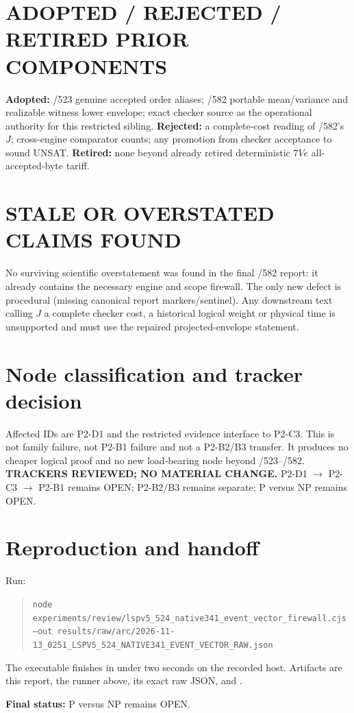 \documentclass[11pt]{article}
\begin{document}
\section*{ADOPTED / REJECTED / RETIRED PRIOR COMPONENTS}
\textbf{Adopted:} /523 genuine accepted order aliases; /582 portable mean/variance and realizable witness lower envelope; exact checker source as the operational authority for this restricted sibling.  \textbf{Rejected:} a complete-cost reading of /582's $J$; cross-engine comparator counts; any promotion from checker acceptance to sound UNSAT.  \textbf{Retired:} none beyond already retired deterministic $7Ve$ all-accepted-byte tariff.

\section*{STALE OR OVERSTATED CLAIMS FOUND}
No surviving scientific overstatement was found in the final /582 report: it already contains the necessary engine and scope firewall.  The only new defect is procedural (missing canonical report markers/sentinel).  Any downstream text calling $J$ a complete checker cost, a historical logical weight or physical time is unsupported and must use the repaired projected-envelope statement.

\section*{Node classification and tracker decision}
Affected IDs are P2-D1 and the restricted evidence interface to P2-C3.  This is not family failure, not P2-B1 failure and not a P2-B2/B3 transfer.  It produces no cheaper logical proof and no new load-bearing node beyond /523--/582.  \textbf{TRACKERS REVIEWED; NO MATERIAL CHANGE.}  P2-D1 $\to$ P2-C3 $\to$ P2-B1 remains OPEN; P2-B2/B3 remains separate; P versus NP remains OPEN.

\section*{Reproduction and handoff}
Run:
\begin{quote}\small
\texttt{node experiments/review/lspv5\_524\_native341\_event\_vector\_firewall.cjs --out results/raw/arc/2026-11-13\_0251\_LSPV5\_524\_NATIVE341\_EVENT\_VECTOR\_RAW.json}
\end{quote}
The executable finishes in under two seconds on the recorded host.  Artifacts are this report, the runner above, its exact raw JSON, and .

\vfill
\noindent\textbf{Final status:} P versus NP remains OPEN.
\end{document}
